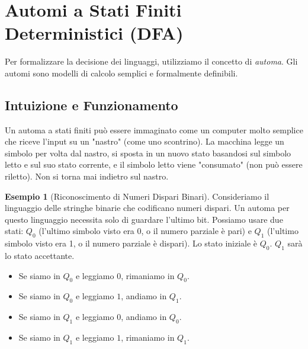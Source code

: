\documentclass[a4paper]{article}
\theoremstyle{definition} %
\newtheorem{example}{Esempio}[section]
\begin{document}
\section{Automi a Stati Finiti Deterministici (DFA)}
Per formalizzare la decisione dei linguaggi, utilizziamo il concetto di \emph{automa}. Gli automi sono modelli di calcolo semplici e formalmente definibili.

\subsection{Intuizione e Funzionamento}
Un automa a stati finiti può essere immaginato come un computer molto semplice che riceve l'input su un "nastro" (come uno scontrino). La macchina legge un simbolo per volta dal nastro, si sposta in un nuovo stato basandosi sul simbolo letto e sul suo stato corrente, e il simbolo letto viene "consumato" (non può essere riletto). Non si torna mai indietro sul nastro.

\begin{example}[Riconoscimento di Numeri Dispari Binari]
Consideriamo il linguaggio delle stringhe binarie che codificano numeri dispari. Un automa per questo linguaggio necessita solo di guardare l'ultimo bit. Possiamo usare due stati: $Q_0$ (l'ultimo simbolo visto era 0, o il numero parziale è pari) e $Q_1$ (l'ultimo simbolo visto era 1, o il numero parziale è dispari). Lo stato iniziale è $Q_0$. $Q_1$ sarà lo stato accettante.
\begin{itemize}
    \item Se siamo in $Q_0$ e leggiamo $0$, rimaniamo in $Q_0$.
    \item Se siamo in $Q_0$ e leggiamo $1$, andiamo in $Q_1$.
    \item Se siamo in $Q_1$ e leggiamo $0$, andiamo in $Q_0$.
    \item Se siamo in $Q_1$ e leggiamo $1$, rimaniamo in $Q_1$.
\end{itemize}
\begin{center}
\end{center}
\end{example}
\end{document}
